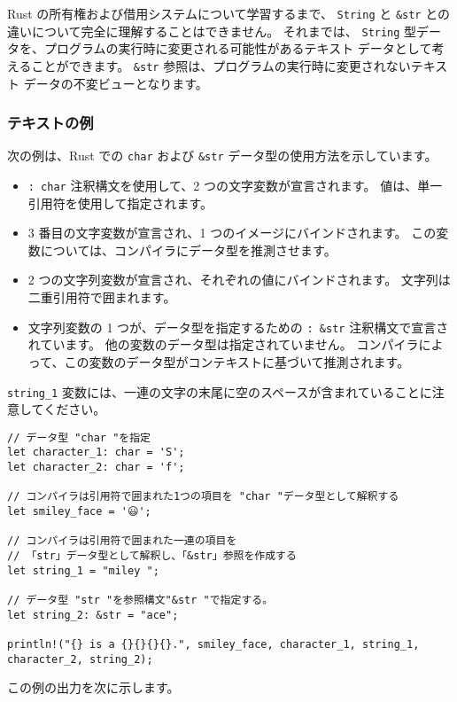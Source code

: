 Rust の所有権および借用システムについて学習するまで、 \texttt{String} と \texttt{\&str} との違いについて完全に理解することはできません。 それまでは、 \texttt{String} 型データを、プログラムの実行時に変更される可能性があるテキスト データとして考えることができます。 \texttt{\&str} 参照は、プログラムの実行時に変更されないテキスト データの不変ビューとなります。

\subsubsection{テキストの例}

次の例は、Rust での \texttt{char} および \texttt{\&str} データ型の使用方法を示しています。

\begin{itemize}
\item \texttt{: char} 注釈構文を使用して、2 つの文字変数が宣言されます。 値は、単一引用符を使用して指定されます。
\item 3 番目の文字変数が宣言され、1 つのイメージにバインドされます。 この変数については、コンパイラにデータ型を推測させます。
\item 2 つの文字列変数が宣言され、それぞれの値にバインドされます。 文字列は二重引用符で囲まれます。
\item 文字列変数の 1 つが、データ型を指定するための \texttt{: \&str} 注釈構文で宣言されています。 他の変数のデータ型は指定されていません。 コンパイラによって、この変数のデータ型がコンテキストに基づいて推測されます。
\end{itemize}

\texttt{string\_1} 変数には、一連の文字の末尾に空のスペースが含まれていることに注意してください。

\begin{lstlisting}[numbers=none]
// データ型 "char "を指定
let character_1: char = 'S';
let character_2: char = 'f';
   
// コンパイラは引用符で囲まれた1つの項目を "char "データ型として解釈する
let smiley_face = '😃';

// コンパイラは引用符で囲まれた一連の項目を
// 「str」データ型として解釈し、「&str」参照を作成する
let string_1 = "miley ";

// データ型 "str "を参照構文"&str "で指定する。
let string_2: &str = "ace";

println!("{} is a {}{}{}{}.", smiley_face, character_1, string_1, character_2, string_2);
\end{lstlisting}

この例の出力を次に示します。


